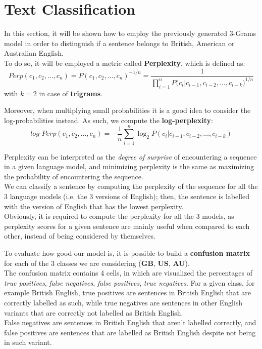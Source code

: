 \documentclass[
12pt,
a4paper,
oneside,
headinclude,
footinclude]{article}
\theoremstyle{definition} %
\begin{document}
\section{Text Classification}
In this section, it will be shown how to employ the previously generated 3-Grams model in order to distinguish if a sentence belongs to British, American or Australian English. \\
To do so, it will be employed a metric called \textbf{Perplexity}, which is defined as:
$$Perp(c_1, c_2, \ldots, c_n) = P(c_1, c_2, \ldots, c_n)^{-1/n} = \frac{1}{\prod_{i=1}^{n}{P(c_i|c_{i-1}, c_{i-2}, \ldots, c_{i-k}})^{1/n}}$$
with $k=2$ in case of \textbf{trigrams}.

Moreover, when multiplying small probabilities it is a good idea to consider the log-probabilities instead. As such, we compute the \textbf{log-perplexity}:
$$log\text{-}Perp(c_1, c_2, \ldots, c_n) = -\frac{1}{n}\sum_{i=1}^{n}{\log_2{P(c_i|c_{i-1}, c_{i-2}, \ldots, c_{i-k})}}$$

Perplexity can be interpreted as the \textit{degree of surprise} of encountering a sequence in a given language model, and minimizing perplexity is the same as maximizing the probability of encountering the sequence.\\

We can classify a sentence by computing the perplexity of the sequence for all the 3 language models (i.e. the 3 versions of English); then, the sentence is labelled with the version of English that has the lowest perplexity.\\
Obviously, it is required to compute the perplexity for all the 3 models, as perplexity scores for a given sentence are mainly useful
when compared to each other, instead of being considered by themselves.

To evaluate how good our model is, it is possible to build a \textbf{confusion matrix} for each of the 3 classes we are considering (\textbf{GB}, \textbf{US}, \textbf{AU}).\\
The confusion matrix contains 4 cells, in which are visualized the percentages of \textit{true positives}, \textit{false negatives}, \textit{false positives}, \textit{true negatives}. For a given class, for example British English, true positives are sentences in British English that are correctly labelled as such, while true negatives are sentences in other English variants that are correctly not labelled as British English.\\
False negatives are sentences in British English that aren't labelled correctly, and false positives are sentences that are labelled as British English despite not being in such variant.\\
\end{document}
